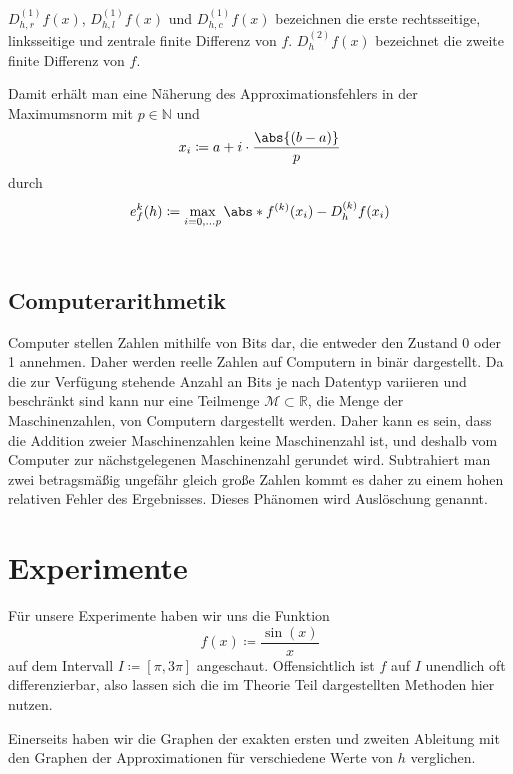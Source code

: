 \documentclass{scrartcl}
\newcommand{\field}[1]{\mathbb{#1}}
\newcommand{\nats}{\field{N}}
\newcommand{\reals}{\field{R}}
\theoremstyle{remark}
\begin{document}
\(D_{h, r}^{(1)} f(x)\), \(D_{h, l}^{(1)} f(x)\) und \(D_{h, c}^{(1)} f(x)\)
bezeichnen die erste rechtsseitige, linksseitige und zentrale finite Differenz von \(f\).
\(D_{h}^{(2)} f(x)\) bezeichnet die zweite finite Differenz von \(f\).

Damit erhält man eine Näherung des Approximationsfehlers in der Maximumsnorm
mit \(p \in \nats\) und
\[
    x_{i} \coloneq a + i \cdot \frac{\abs{(b - a)}}{p}
\]
durch
\[
    e_f^k(h) \coloneq \max_{i = 0, \dots p} \abs*{f^{(k)}(x_i) - D_h^{(k)} f(x_i)}
\]~\cite{PPI_FiniteDifferences}

\subsection{Computerarithmetik}

Computer stellen Zahlen mithilfe von Bits dar, die entweder den Zustand 0 oder
1 annehmen. Daher werden reelle Zahlen auf Computern in binär dargestellt. Da
die zur Verfügung stehende Anzahl an Bits je nach Datentyp variieren und
beschränkt sind kann nur eine Teilmenge \(\mathcal{M} \subset \reals\), die
Menge der Maschinenzahlen, von Computern dargestellt werden. Daher kann es
sein, dass die Addition zweier Maschinenzahlen keine Maschinenzahl ist, und
deshalb vom Computer zur nächstgelegenen Maschinenzahl gerundet wird.
Subtrahiert man zwei betragsmäßig ungefähr gleich große Zahlen kommt es daher
zu einem hohen relativen Fehler des Ergebnisses. Dieses Phänomen wird
Auslöschung genannt.\ \cite{VL_ewr_2024}

\pagebreak

\section{Experimente}

Für unsere Experimente haben wir uns die Funktion
\[
    f(x) \coloneq \frac{\sin(x)}{x}
\]
auf dem Intervall \(I \coloneq [\pi, 3 \pi]\) angeschaut. Offensichtlich ist
  \(f\) auf \(I\) unendlich oft differenzierbar, also lassen sich die im
  Theorie Teil dargestellten Methoden hier nutzen.

Einerseits haben wir die Graphen der exakten ersten und zweiten Ableitung mit
den Graphen der Approximationen für verschiedene Werte von \(h\) verglichen.
\end{document}
